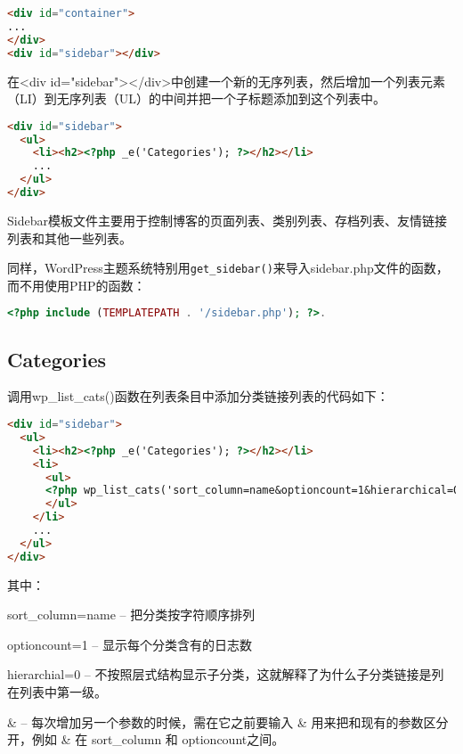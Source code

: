 \begin{lstlisting}[language=HTML]
<div id="container">
...
</div>
<div id="sidebar"></div>
\end{lstlisting}

在<div id="sidebar"></div>中创建一个新的无序列表，然后增加一个列表元素（LI）到无序列表（UL）的中间并把一个子标题添加到这个列表中。

\begin{lstlisting}[language=HTML]
<div id="sidebar">
  <ul>
    <li><h2><?php _e('Categories'); ?></h2></li>
    ...
  </ul>
</div>
\end{lstlisting}

Sidebar模板文件主要用于控制博客的页面列表、类别列表、存档列表、友情链接列表和其他一些列表。

同样，WordPress主题系统特别用\texttt{get\_sidebar()}来导入sidebar.php文件的函数，而不用使用PHP的函数：

\begin{lstlisting}[language=PHP]
<?php include (TEMPLATEPATH . '/sidebar.php'); ?>.
\end{lstlisting}


\subsection{Categories}

调用wp\_list\_cats()函数在列表条目中添加分类链接列表的代码如下：


\begin{lstlisting}[language=HTML]
<div id="sidebar">
  <ul>
    <li><h2><?php _e('Categories'); ?></h2></li>
    <li>
      <ul>
      <?php wp_list_cats('sort_column=name&optioncount=1&hierarchical=0'); ?>
      </ul>
    </li>
    ...
  </ul>
</div>
\end{lstlisting}

其中：

\begin{compactitem}
\item sort\_column=name – 把分类按字符顺序排列
\item optioncount=1 – 显示每个分类含有的日志数
\item hierarchial=0 – 不按照层式结构显示子分类，这就解释了为什么子分类链接是列在列表中第一级。
\item \& – 每次增加另一个参数的时候，需在它之前要输入 \& 用来把和现有的参数区分开，例如 \& 在 sort\_column 和 optioncount之间。

\end{compactitem}




